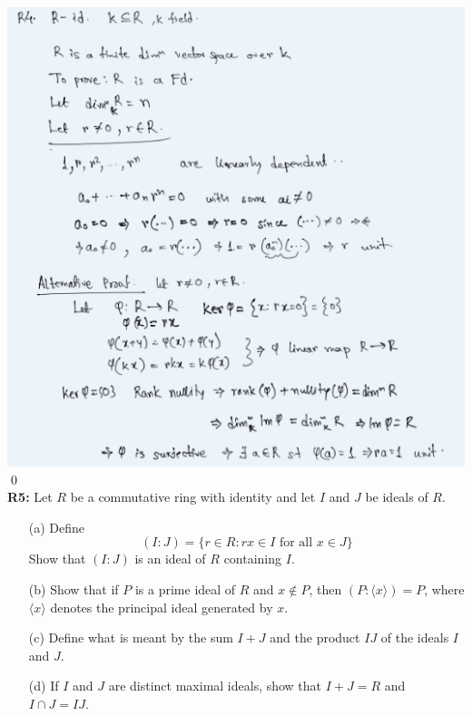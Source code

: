 \includegraphics{R2.4.png}
\qed\\
\newpage
\textbf{R5:} Let $R$ be a commutative ring with identity and let $I$ and $J$ be ideals of $R$.\\
\begin{itemize}
	\item[(a)] Define
$$
(I: J)=\{r \in R: r x \in I \text { for all } x \in J\}
$$
Show that $(I: J)$ is an ideal of $R$ containing $I$.
	\item[(b)] Show that if $P$ is a prime ideal of $R$ and $x \notin P$, then $(P:\langle x\rangle)=P$, where $\langle x\rangle$ denotes the principal ideal generated by $x$.
	\item[(c)] Define what is meant by the sum $I+J$ and the product $I J$ of the ideals $I$ and $J$.
	\item[(d)] If $I$ and $J$ are distinct maximal ideals, show that $I+J=R$ and $I \cap J=I J$.
\end{itemize}

\soln

